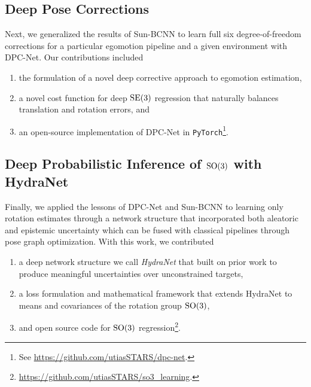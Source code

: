 

\subsection{Deep Pose Corrections}

Next, we generalized the results of Sun-BCNN to learn full six degree-of-freedom corrections for a particular egomotion pipeline and a given environment with DPC-Net. Our contributions included

\begin{enumerate}
	\item the formulation of a novel deep corrective approach to egomotion estimation,
	\item a novel cost function for deep $\mathrm{SE}(3)$ regression that naturally balances translation and rotation errors, and
	\item an open-source implementation of DPC-Net in \texttt{PyTorch}\footnote{See \url{https://github.com/utiasSTARS/dpc-net}.}.
\end{enumerate}



\subsection{Deep Probabilistic Inference of $\mathrm{SO}(3)$ with HydraNet}


Finally, we applied the lessons of DPC-Net and Sun-BCNN to learning only rotation estimates through a network structure that incorporated both aleatoric and epistemic uncertainty which can be fused with classical pipelines through pose graph optimization. With this work, we contributed
\begin{enumerate}
\item a deep network structure we call \textit{HydraNet} that built on prior work \cite{Lakshminarayanan2017,Osband2016} to produce meaningful uncertainties over unconstrained targets,
\item a loss formulation and mathematical framework that extends HydraNet to means and covariances of the rotation group $\mathrm{SO}(3)$,
\item and open source code for $\mathrm{SO}(3)$ regression\footnote{\url{https://github.com/utiasSTARS/so3_learning}.}.
\end{enumerate}

